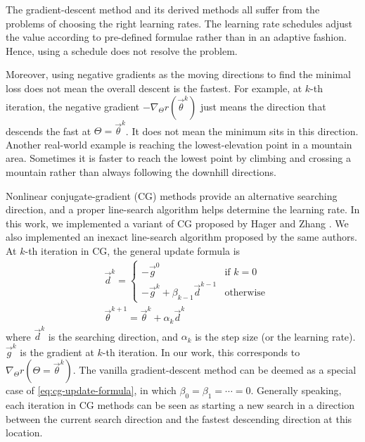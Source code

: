 
The gradient-descent method and its derived methods all suffer from the problems of choosing the right learning rates.
The learning rate schedules adjust the value according to pre-defined formulae rather than in an adaptive fashion.
Hence, using a schedule does not resolve the problem.

Moreover, using negative gradients as the moving directions to find the minimal loss does not mean the overall descent is the fastest.
For example, at $k$-th iteration, the negative gradient $- \nabla_{\Theta} r(\vec{\theta}^k)$ just means the direction that descends the fast at $\Theta=\vec{\theta}^k$.
It does not mean the minimum sits in this direction.
Another real-world example is reaching the lowest-elevation point in a mountain area.
Sometimes it is faster to reach the lowest point by climbing and crossing a mountain rather than always following the downhill directions.

Nonlinear conjugate-gradient (CG) methods provide an alternative searching direction, and a proper line-search algorithm helps determine the learning rate.
In this work, we implemented a variant of CG proposed by Hager and Zhang \cite{hager_new_2005,hager_survey_2006,hager_algorithm_2006}.
We also implemented an inexact line-search algorithm proposed by the same authors.
At $k$-th iteration in CG, the general update formula is
\begin{equation}\label{eq:cg-update-formula}
    \begin{aligned}
        &\vec{d}^k = 
        \left\{
            \begin{array}{ll}
                -\vec{g}^0 & \text{if\ }k = 0 \\
                -\vec{g}^k + \beta_{k-1}\vec{d}^{k-1} & \text{otherwise}
            \end{array}
        \right. \\
        &\vec{\theta}^{k+1} = \vec{\theta}^k + \alpha_k \vec{d}^k
    \end{aligned}
\end{equation}
where $\vec{d}^k$ is the searching direction, and $\alpha_k$ is the step size (or the learning rate).
$\vec{g}^k$ is the gradient at $k$-th iteration.
In our work, this corresponds to $\nabla_{\Theta} r(\Theta=\vec{\theta}^k)$.
The vanilla gradient-descent method can be deemed as a special case of \eqref{eq:cg-update-formula}, in which $\beta_0=\beta_1=\cdots=0$.
Generally speaking, each iteration in CG methods can be seen as starting a new search in a direction between the current search direction and the fastest descending direction at this location.

